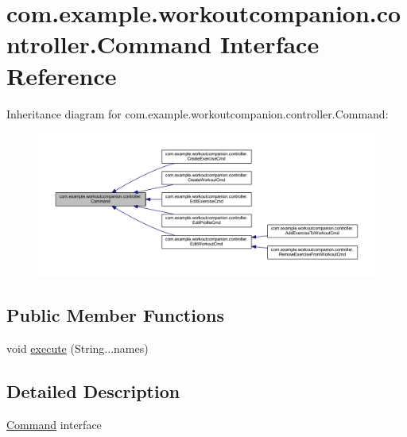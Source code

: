 \hypertarget{interfacecom_1_1example_1_1workoutcompanion_1_1controller_1_1_command}{\section{com.\-example.\-workoutcompanion.\-controller.\-Command Interface Reference}
\label{interfacecom_1_1example_1_1workoutcompanion_1_1controller_1_1_command}
}


Inheritance diagram for com.\-example.\-workoutcompanion.\-controller.\-Command\-:\nopagebreak
\begin{figure}[H]
\begin{center}
\leavevmode
\includegraphics[width=350pt]{interfacecom_1_1example_1_1workoutcompanion_1_1controller_1_1_command__inherit__graph}
\end{center}
\end{figure}
\subsection*{Public Member Functions}
\begin{DoxyCompactItemize}
\item 
void \hyperlink{interfacecom_1_1example_1_1workoutcompanion_1_1controller_1_1_command_ad947864c82a300557eed99dd8367c020}{execute} (String...\-names)
\end{DoxyCompactItemize}


\subsection{Detailed Description}
\hyperlink{interfacecom_1_1example_1_1workoutcompanion_1_1controller_1_1_command}{Command} interface 


